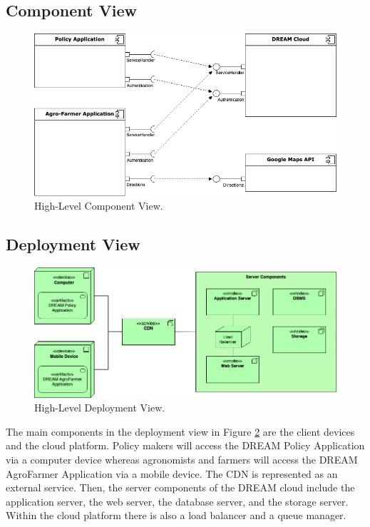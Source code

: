 \subsection{Component View}

\begin{figure}[hbt!]
\centering
\includegraphics[width=\textwidth]{../images_diagrams/dd/high_level_cloud.png}
\caption{High-Level Component View.}
\label{fig:highLevelComp}
\end{figure}

\subsection{Deployment View}
\begin{figure}[hbt!]
\centering
\includegraphics[width=\textwidth]{../images_diagrams/dd/highlevel_deployment.png}
\caption{High-Level Deployment View.}
\label{fig:highLevelDeploy}
\end{figure}

\begin{flushleft}
The main components in the deployment view in Figure \ref{fig:highLevelDeploy} are the client devices and the cloud platform. Policy makers will access the DREAM Policy Application via a computer device whereas agronomists and farmers will access the DREAM AgroFarmer Application via a mobile device. The CDN is represented as an external service. Then, the server components of the DREAM cloud include the application server, the web server, the database server, and the storage server. Within the cloud platform there is also a load balancer and a queue manager.
\end{flushleft}




